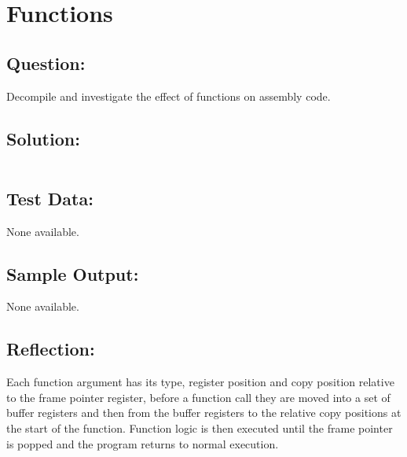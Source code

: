 \documentclass[Lab-C.tex]{subfiles}
\begin{document}
    \section{Functions}
        \subsection*{Question:}
            Decompile and investigate the effect of functions on assembly code.
            
        \subsection*{Solution:}
            \inputminted{cpp}{../Tasks/03-Functions/Functions.cpp}%

        \subsection*{Test Data:}
            None available.
        
        \subsection*{Sample Output:}
            None available.

        \subsection*{Reflection:}
            Each function argument has its type, register position and copy position relative to the frame pointer register,
            before a function call they are moved into a set of buffer registers and then from the buffer registers
            to the relative copy positions at the start of the function. Function logic is then executed until the frame pointer is popped
            and the program returns to normal execution.
\end{document}
